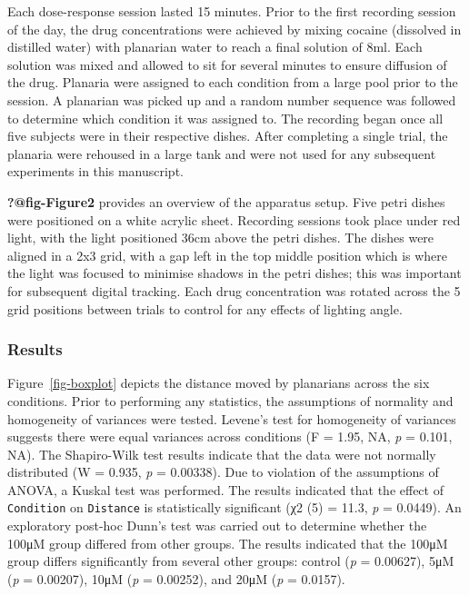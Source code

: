 \documentclass[
  letterpaper,
  DIV=11,
  numbers=noendperiod,
  oneside]{scrartcl}
\begin{document}
Each dose-response session lasted 15 minutes. Prior to the first
recording session of the day, the drug concentrations were achieved by
mixing cocaine (dissolved in distilled water) with planarian water to
reach a final solution of 8ml. Each solution was mixed and allowed to
sit for several minutes to ensure diffusion of the drug. Planaria were
assigned to each condition from a large pool prior to the session. A
planarian was picked up and a random number sequence was followed to
determine which condition it was assigned to. The recording began once
all five subjects were in their respective dishes. After completing a
single trial, the planaria were rehoused in a large tank and were not
used for any subsequent experiments in this manuscript.

\textbf{?@fig-Figure2} provides an overview of the apparatus setup. Five
petri dishes were positioned on a white acrylic sheet. Recording
sessions took place under red light, with the light positioned 36cm
above the petri dishes. The dishes were aligned in a 2x3 grid, with a
gap left in the top middle position which is where the light was focused
to minimise shadows in the petri dishes; this was important for
subsequent digital tracking. Each drug concentration was rotated across
the 5 grid positions between trials to control for any effects of
lighting angle.

\subsubsection{Results}\label{results}

Figure~\ref{fig-boxplot} depicts the distance moved by planarians across
the six conditions. Prior to performing any statistics, the assumptions
of normality and homogeneity of variances were tested. Levene's test for
homogeneity of variances suggests there were equal variances across
conditions (F = 1.95, NA, \emph{p} = 0.101, NA). The Shapiro-Wilk test
results indicate that the data were not normally distributed (W = 0.935,
\emph{p} = 0.00338). Due to violation of the assumptions of ANOVA, a
Kuskal test was performed. The results indicated that the effect of
\texttt{Condition} on \texttt{Distance} is statistically significant (χ2
(5) = 11.3, \emph{p} = 0.0449). An exploratory post-hoc Dunn's test was
carried out to determine whether the 100μM group differed from other
groups. The results indicated that the 100μM group differs significantly
from several other groups: control (\emph{p} = 0.00627), 5μM (\emph{p} =
0.00207), 10μM (\emph{p} = 0.00252), and 20μM (\emph{p} = 0.0157).
\end{document}
